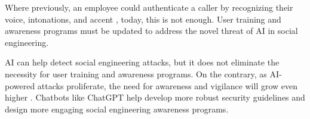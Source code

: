 Where previously, an employee could authenticate a caller by recognizing their voice, intonations, and accent \citep{mitnick_The_Art_of_Deception_2003}, today, this is not enough. User training and awareness programs must be updated to address the novel threat of AI in social engineering.


    
AI can help detect social engineering attacks, but it does not eliminate the necessity for user training and awareness programs. On the contrary, as AI-powered attacks proliferate, the need for awareness and vigilance will grow even higher \citep{fakhouri_AI_Driven_Solutions_SE_Attacks_2024}. Chatbots like ChatGPT help develop more robust security guidelines and design more engaging social engineering awareness programs.




